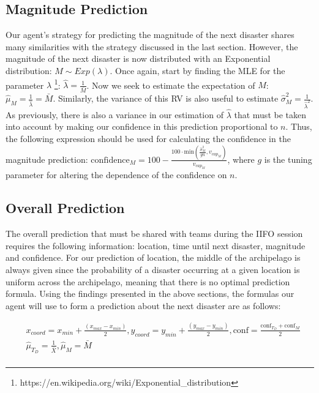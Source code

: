\subsection{Magnitude Prediction}
Our agent's strategy for predicting the magnitude of the next disaster shares many similarities with the strategy discussed in the last section. However, the magnitude of the next disaster is now distributed with an Exponential distribution: $M \sim Exp(\lambda)$. Once again, start by finding the MLE for the parameter $\lambda$ \footnote{https://en.wikipedia.org/wiki/Exponential\_distribution}: $\hat{\lambda} = \frac{1}{\bar{M}}$. Now we seek to estimate the expectation of $M$: $\hat{\mu}_M = \frac{1}{\hat{\lambda}} = \bar{M}$. Similarly, the variance of this RV is also useful to estimate $\hat{\sigma}_{M}^2= \frac{1}{\hat{\lambda}^2}$. As previously, there is also a variance in our estimation of $\hat{\lambda}$ that must be taken into account by making our confidence in this prediction proportional to $n$. Thus, the following expression should be used for calculating the confidence in the magnitude prediction: $\text{confidence}_M = 100 - \frac{100 \cdot \text{min}(\frac{\hat{\sigma}_{M}^2}{gn}, v_{cap_M})}{v_{cap_M}}$, where $g$ is the tuning parameter for altering the dependence of the confidence on $n$. 

\subsection{Overall Prediction}
The overall prediction that must be shared with teams during the IIFO session requires the following information: location, time until next disaster, magnitude and confidence. For our prediction of location, the middle of the archipelago is always given since the probability of a disaster occurring at a given location is uniform across the archipelago, meaning that there is no optimal prediction formula. Using the findings presented in the above sections, the formulas our agent will use to form a prediction about the next disaster are as follows:

\begin{align*}
    &x_{coord} = x_{min} + \frac{(x_{max}-x_{min})}{2}, y_{coord} = y_{min} + \frac{(y_{max}-y_{min})}{2}, \text{conf} =\frac{\text{conf}_{T_D} + \text{conf}_M}{2} \\
    &\hat{\mu}_{T_D}=\frac{1}{\bar{X}}, \hat{\mu}_M = \bar{M} \\
\end{align*}

